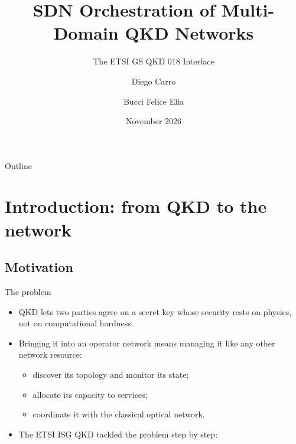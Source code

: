 \documentclass[10pt]{beamer}
\title[ETSI GS QKD 018]{SDN Orchestration of Multi-Domain QKD Networks}
\subtitle{The ETSI GS QKD 018 Interface}
\author[D.~Carro, F.~E.~Bucci]{Diego Carro \and Bucci Felice Elia}
\institute[PoliTo]{Cybersecurity course, Politecnico di Torino\\Quantum Engineering}
\date{November 2026}
\begin{document}
\begin{frame}
  \titlepage
\end{frame}

\begin{frame}{Outline}
  \tableofcontents[hideallsubsections]
\end{frame}

\section[Introduction]{Introduction: from QKD to the network}

\subsection{Motivation}

\begin{frame}{The problem}
  \begin{itemize}
    \item QKD lets two parties agree on a secret key whose security rests
          on \alert{physics}, not on computational hardness.
    \item Bringing it into an operator network means managing it like any
          other \alert{network resource}:
          \begin{itemize}
            \item discover its topology and monitor its state;
            \item allocate its capacity to services;
            \item coordinate it with the classical optical network.
          \end{itemize}
    \item The ETSI ISG QKD tackled the problem step by step:
  \end{itemize}
  \vspace{1ex}
  \begin{center}
  \end{center}
\end{frame}
\end{document}
